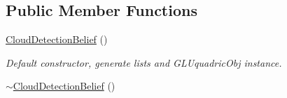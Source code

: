 \subsection*{Public Member Functions}
\begin{DoxyCompactItemize}
\item 
\hypertarget{class_cloud_detection_belief_abe902ea58955b0bcc48fee23b0b858dc}{
\hyperlink{class_cloud_detection_belief_abe902ea58955b0bcc48fee23b0b858dc}{CloudDetectionBelief} ()}
\label{class_cloud_detection_belief_abe902ea58955b0bcc48fee23b0b858dc}

\begin{DoxyCompactList}\small\item\em Default constructor, generate lists and GLUquadricObj instance. \end{DoxyCompactList}\item 
\hypertarget{class_cloud_detection_belief_ac30de9e0028b1c3ffe472ff4be556f6c}{
\hyperlink{class_cloud_detection_belief_ac30de9e0028b1c3ffe472ff4be556f6c}{$\sim$CloudDetectionBelief} ()}
\label{class_cloud_detection_belief_ac30de9e0028b1c3ffe472ff4be556f6c}


\end{DoxyCompactItemize}

